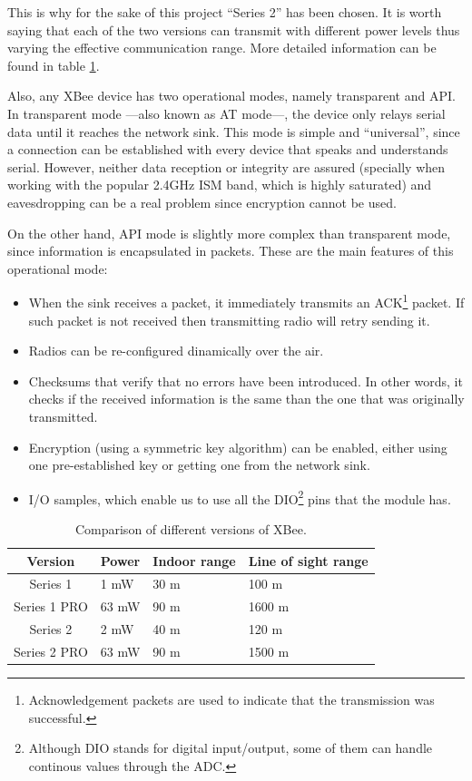 This is why for the sake of this project ``Series 2'' has been chosen. It is worth saying that each of the two versions can transmit with different power levels thus varying the effective communication range\cite{faludi2010building}. More detailed information can be found in table \ref{tab:xbee_versions}.

Also, any XBee\textregistered{} device has two operational modes, namely transparent and API. In transparent mode ---also known as AT mode---, the device only relays serial data until it reaches the network sink. This mode is simple and ``universal'', since a connection can be established with every device that speaks and understands serial. However, neither data reception or integrity are assured (specially when working with the popular 2.4GHz ISM band, which is highly saturated) and eavesdropping can be a real problem since encryption cannot be used. 

On the other hand, API mode is slightly more complex than transparent mode, since information is encapsulated in packets. These are the main features of this operational mode:

\begin{itemize}
    \item When the sink receives a packet, it immediately transmits an ACK\footnote{Acknowledgement packets are used to indicate that the transmission was successful.} packet. If such packet is not received then transmitting radio will retry sending it.
    \item Radios can be re-configured dinamically over the air.
    \item Checksums that verify that no errors have been introduced. In other words, it checks if the received information is the same than the one that was originally transmitted.
    \item Encryption (using a symmetric key algorithm) can be enabled, either using one pre-established key or getting one from the network sink.
    \item I/O samples, which enable us to use all the DIO\footnote{Although DIO stands for digital input/output, some of them can handle continous values through the ADC.} pins that the module has.
\end{itemize}

\begin{table}[ht] 
\centering
\begin{tabular}{c|l l l}
    Version     & Power                 & Indoor range     & Line of sight range\\
\hline
Series 1        & 1 mW                   & 30 m              & 100 m\\
Series 1 PRO    & 63 mW  & 90 m              & 1600 m\\
Series 2        & 2 mW                   & 40 m              & 120 m\\
Series 2 PRO    & 63 mW  & 90 m              & 1500 m\\
\end{tabular}
\caption{Comparison of different versions of XBee\textregistered.}
\label{tab:xbee_versions}
\end{table}

